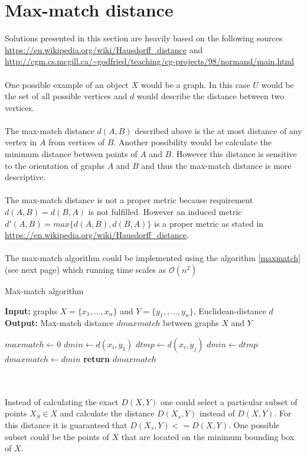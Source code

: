 \documentclass[article,11pt]{article}
\begin{document}
\section{Max-match distance}
Solutions presented in this section are heavily based on the following sources
\url{https://en.wikipedia.org/wiki/Hausdorff_distance} and \url{http://cgm.cs.mcgill.ca/~godfried/teaching/cg-projects/98/normand/main.html}\\

\\
One possible example of an object $X$ would be a graph. In this case $U$ would
be the set of all possible vertices and $d$ would describe the distance
between two vertices.\\

\\
The max-match distance $d(A,B)$ described above is the at most distance of any
vertex in $A$ from vertices of $B$. Another possibility would be
calculate the minimum distance between points of $A$ and $B$. However this
distance is sensitive to the orientation of graphs $A$ and $B$ and thus the
max-match distance is more descriptive.\\

\\
The max-match distance is not a proper metric because requirement $d(A,B) = d(B,A)$ is not fulfilled. However an induced metric $d'(A,B) = max\{ d(A,B), d(B,A)\}$ is a proper metric as stated in \url{https://en.wikipedia.org/wiki/Hausdorff_distance}.\\

\\
The max-match algorithm could be implemented using the algorithm \ref{maxmatch}
(see next page) which running time scales as $\mathcal{O}(n^2)$\\
\begin{algorithm}
  \caption{Max-match algorithm}
  \textbf{Input: } graphs $X = \{ x_1,\ldots ,x_n\}$ and
  $Y = \{y_1,,\ldots,y_n\}$, Euclidean-distance $d$\\
  \textbf{Output: } Max-match distance $dmaxmatch$ between graphs $X$ and $Y$ 
 \begin{algorithmic}[1]
   \State $maxmatch\gets 0$
   \State $dmin \gets d(x_i, y_1)$
   \State $dtmp\gets d(x_i,y_j)$
   \State $dmin\gets dtmp$
   \EndIf
   \EndFor
   \State $dmaxmatch\gets dmin$
   \EndIf
   \EndFor
   \State \textbf{return} $dmaxmatch$
 \end{algorithmic}
 \label{maxmatch}
\end{algorithm}\\
\\
Instead of calculating the exact $D(X,Y)$ one could select a particular subset
of points $X_S \in X$ and calculate the distance $D(X_s, Y)$ instead of
$D(X,Y)$. For this distance it is guaranteed that $D(X_s, Y) <= D(X, Y)$. One
possible subset could be the points of $X$ that are located on the minimum
bounding box of $X$.\\
\end{document}
